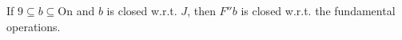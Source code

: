 If $9 \subseteq b \subseteq \mathrm{On}$ and $b$ is closed w.r.t. $J$, then $F''b$ is closed w.r.t. the fundamental operations.
